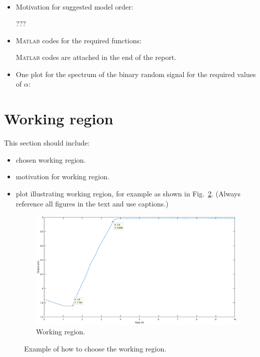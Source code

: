 \documentclass[10pt,a4paper]{article}
\begin{document}
\begin{itemize}
\begin{align*}
	\end{align*}
    \item Motivation for suggested model order:
    \par ???
    \item \textsc{Matlab} codes for the required functions:
    \par \textsc{Matlab} codes are attached in the end of the report.
    \item One plot for the spectrum of the binary random signal for the required values of $\alpha$:
\end{itemize}

\section{Working region}
This section should include:
\begin{itemize}
    \item chosen working region.
    \item motivation for working region.
    \item plot illustrating working region, for example as shown in Fig.~\ref{fig:workingRegion}. (Always reference all figures in the text and use captions.)
    \begin{figure}[ht]
		\footnotesize
		\centering 
		\includegraphics[width=\columnwidth]{workingRegion.eps} 
		\caption{Working region.}
		\label{fig:workingRegion}
	\end{figure}
\end{itemize}
%
\begin{figure}[ht]
	\footnotesize
	\centering 
	\def\svgwidth{.8\columnwidth}
	 
	\caption{Example of how to choose the working region.}
	\label{fig:workingRegion}
	\end{figure}
\end{document}
